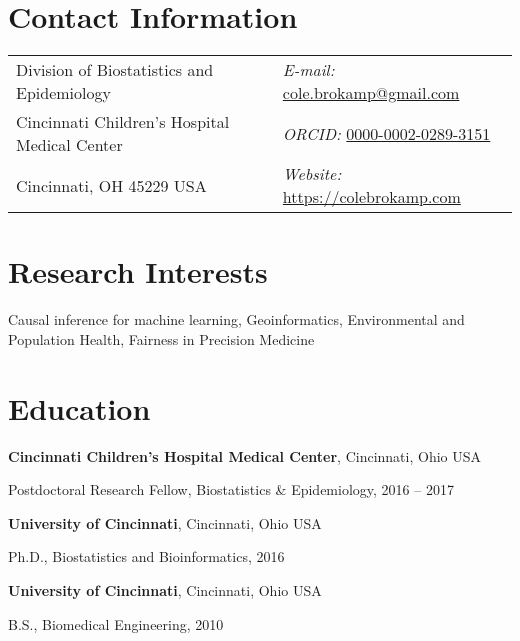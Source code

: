 \documentclass[margin,line]{res}
\newenvironment{list1}{
  \begin{list}{\ding{113}}{%
      \setlength{\itemsep}{0in}
      \setlength{\parsep}{0in} \setlength{\parskip}{0in}
      \setlength{\topsep}{0in} \setlength{\partopsep}{0in}
      \setlength{\leftmargin}{0.17in}}}{\end{list}}
\begin{document}

\begin{resume}
\section{\sc Contact Information}
\vspace{.05in}
\begin{tabular}{@{}p{3in}p{4in}}
  Division of Biostatistics and Epidemiology & {\it E-mail:}  \href{mailto:cole.brokamp@gmail.com}{cole.brokamp@gmail.com}\\
  Cincinnati Children's Hospital Medical Center & {\it ORCID:} \href{https://orcid.org/0000-0002-0289-3151}{0000-0002-0289-3151}\\
  Cincinnati, OH 45229 USA  & {\it Website:} \href{https://colebrokamp.com}{https://colebrokamp.com} \\
\end{tabular}


\section{\sc Research Interests}
Causal inference for machine learning, Geoinformatics, Environmental and Population Health, Fairness in Precision Medicine

\section{\sc Education}

{\bf Cincinnati Children's Hospital Medical Center}, Cincinnati, Ohio USA \\
\vspace*{-.1in}
\begin{list1}
\item[]Postdoctoral Research Fellow, Biostatistics \& Epidemiology, 2016 -- 2017
\end{list1}

{\bf University of Cincinnati}, Cincinnati, Ohio USA \\
\vspace*{-.1in}
\begin{list1}
\item[]Ph.D., Biostatistics and Bioinformatics, 2016
\end{list1}

{\bf University of Cincinnati}, Cincinnati, Ohio USA\\
\vspace*{-.1in}
\begin{list1}
\item[]B.S., Biomedical Engineering, 2010
\end{list1}



\end{resume}
\end{document}
